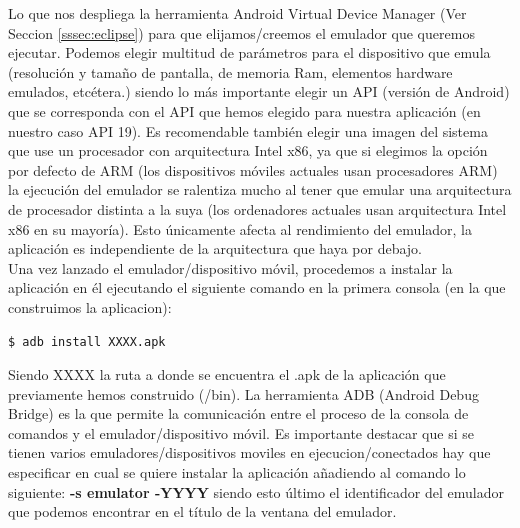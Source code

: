  	 Lo que nos despliega la herramienta Android Virtual Device Manager (Ver Seccion \ref{sssec:eclipse}) para que elijamos/creemos el emulador que queremos ejecutar. Podemos elegir multitud de parámetros \cite{ref:android_avd_params} para el dispositivo que emula (resolución y tamaño de pantalla, de memoria Ram, elementos hardware emulados, etcétera.) siendo lo más importante elegir un API (versión de Android) que se corresponda con el API que hemos elegido para nuestra aplicación (en nuestro caso API 19). Es recomendable también elegir una imagen del sistema que use un procesador con arquitectura Intel x86, ya que si elegimos la opción por defecto de ARM (los dispositivos móviles actuales usan procesadores ARM) la ejecución del emulador se ralentiza mucho al tener que emular una arquitectura de procesador distinta a la suya (los ordenadores actuales usan arquitectura Intel x86 en su mayoría). Esto únicamente afecta al rendimiento del emulador, la aplicación es independiente de la arquitectura que haya por debajo. \\[.2cm]
 
     Una vez lanzado el emulador/dispositivo móvil, procedemos a instalar la aplicación en él ejecutando el siguiente comando en la primera consola (en la que construimos la aplicacion):
		      	 
 	 \begin{lstlisting}[style=console, numbers=none]
		$ adb install XXXX.apk
	 \end{lstlisting}		
 	 
 	 Siendo XXXX la ruta a donde se encuentra el .apk de la aplicación que previamente hemos construido (/bin). La herramienta ADB (Android Debug Bridge) \cite{ref:android_adb} es la que permite la comunicación entre el proceso de la consola de comandos y el emulador/dispositivo móvil. Es importante destacar que si se tienen varios emuladores/dispositivos moviles en ejecucion/conectados hay que especificar en cual se quiere instalar la aplicación añadiendo al comando lo siguiente: \textbf{-s emulator -YYYY} siendo esto último el identificador del emulador que podemos encontrar en el título de la ventana del emulador. \\[.2cm]
	     
